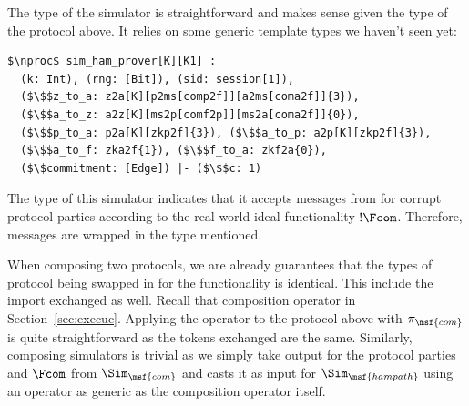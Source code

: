 The type of the simulator is straightforward and makes sense given the type of the protocol above. It
relies on some generic template types we haven't seen yet:

\begin{lstlisting}[basicstyle=\footnotesize\BeraMonottFamily, frame=single, mathescape]
$\nproc$ sim_ham_prover[K][K1] :
  (k: Int), (rng: [Bit]), (sid: session[1]),
  ($\$$z_to_a: z2a[K][p2ms[comp2f]][a2ms[coma2f]]{3}), 
  ($\$$a_to_z: a2z[K][ms2p[comf2p]][ms2a[coma2f]]{0}),
  ($\$$p_to_a: p2a[K][zkp2f]{3}), ($\$$a_to_p: a2p[K][zkp2f]{3}), 
  ($\$$a_to_f: zka2f{1}), ($\$$f_to_a: zkf2a{0}),
  ($\$commitment: [Edge]) |- ($\$$c: 1)
\end{lstlisting}

The type of this simulator indicates that it accepts messages from \Z for corrupt protocol parties
according to the real world ideal functionality $!\Fcom$. Therefore, messages are wrapped in the 
 type mentioned. 

When composing two protocols, we are already guarantees that the types of protocol being swapped in for the functionality is identical. 
This include the import exchanged as well. 
Recall that composition operator in Section~\ref{sec:execuc}. Applying the operator to the protocol above with $\pi_\msf{com}$ is quite straightforward as the tokens exchanged are the same.
Similarly, composing simulators is trivial as we simply take output for the protocol parties and $\Fcom$ from $\Sim_\msf{com}$ and casts it as  input for $\Sim_\msf{hampath}$ using an operator as generic as the composition operator itself.

